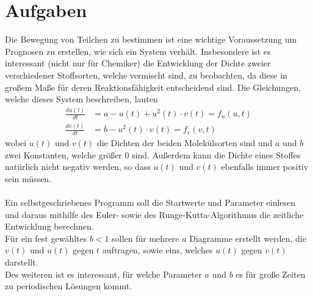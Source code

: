 \documentclass[12pt,a4paper,titlepage,headinclude,bibtotoc]{scrartcl}
\begin{document}
\section{Aufgaben}
Die Bewegung von Teilchen zu bestimmen ist eine wichtige Voraussetzung um Prognosen zu erstellen, wie sich ein System verhält.
Insbesondere ist es interessant (nicht nur für Chemiker) die Entwicklung der Dichte zweier verschiedener Stoffsorten, welche vermischt sind, zu beobachten, da diese in großem Maße für deren Reaktionsfähigkeit entscheidend sind.
Die Gleichungen, welche dieses System beschreiben, lauten
\begin{align}
\frac{du(t)}{dt}&=a-u(t)+u^2(t)\cdot v(t)=f_u(u,t)\\
\frac{dv(t)}{dt}&=b-u^2(t)\cdot v(t)=f_v(v,t)
\end{align}
wobei $u(t)$ und $v(t)$ die Dichten der beiden Molekülsorten sind und $a$ und $b$ zwei Konstanten, welche größer 0 sind. Außerdem kann die Dichte eines Stoffes natürlich nicht negativ werden, so dass $u(t)$ und $v(t)$ ebenfalls immer positiv sein müssen.\\\\
Ein selbstgeschriebenes Programm soll die Startwerte und Parameter einlesen und daraus mithilfe des Euler- sowie des Runge-Kutta-Algorithmus die zeitliche Entwicklung berechnen.\\
Für ein fest gewähltes $b<1$ sollen für mehrere $a$ Diagramme erstellt werden, die $v(t)$ und $u(t)$ gegen $t$ auftragen, sowie eins, welches $u(t)$ gegen $v(t)$ darstellt.\\
Des weiteren ist es interessant, für welche Parameter $a$ und $b$ es für große Zeiten zu periodischen Lösungen kommt.
\end{document}
